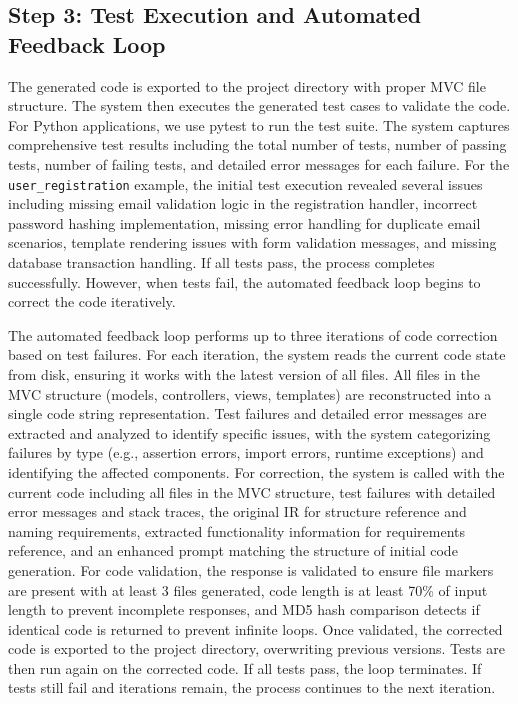\subsection{Step 3: Test Execution and Automated Feedback Loop}

The generated code is exported to the project directory with proper MVC file structure. The system then executes the generated test cases to validate the code. For Python applications, we use pytest to run the test suite. The system captures comprehensive test results including the total number of tests, number of passing tests, number of failing tests, and detailed error messages for each failure. For the \texttt{user\_registration} example, the initial test execution revealed several issues including missing email validation logic in the registration handler, incorrect password hashing implementation, missing error handling for duplicate email scenarios, template rendering issues with form validation messages, and missing database transaction handling. If all tests pass, the process completes successfully. However, when tests fail, the automated feedback loop begins to correct the code iteratively.

The automated feedback loop performs up to three iterations of code correction based on test failures. For each iteration, the system reads the current code state from disk, ensuring it works with the latest version of all files. All files in the MVC structure (models, controllers, views, templates) are reconstructed into a single code string representation. Test failures and detailed error messages are extracted and analyzed to identify specific issues, with the system categorizing failures by type (e.g., assertion errors, import errors, runtime exceptions) and identifying the affected components. For correction, the system is called with the current code including all files in the MVC structure, test failures with detailed error messages and stack traces, the original IR for structure reference and naming requirements, extracted functionality information for requirements reference, and an enhanced prompt matching the structure of initial code generation. For code validation, the response is validated to ensure file markers are present with at least 3 files generated, code length is at least 70\% of input length to prevent incomplete responses, and MD5 hash comparison detects if identical code is returned to prevent infinite loops. Once validated, the corrected code is exported to the project directory, overwriting previous versions. Tests are then run again on the corrected code. If all tests pass, the loop terminates. If tests still fail and iterations remain, the process continues to the next iteration.

